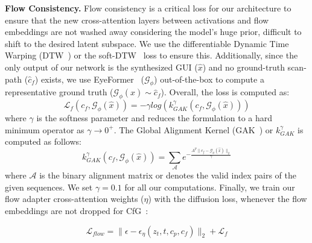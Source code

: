 \textbf{Flow Consistency.}
Flow consistency is a critical loss for our architecture to ensure that the new cross-attention layers between activations and flow embeddings are not washed away considering the model's huge prior, difficult to shift to the desired latent subspace.
We use the differentiable Dynamic Time Warping (DTW~\cite{dtw}) or the soft-DTW~\cite{soft-dtw} loss to ensure this.
Additionally, since the only output of our network is the synthesized GUI ($\hat{x}$) and no ground-truth scan-path ($\hat{c}_f$) exists, we use EyeFormer~\cite{eyeformer} ($\mathcal{G}_\phi$) out-of-the-box to compute a representative ground truth ($\mathcal{G}_\phi(\hat{x}) \sim \hat{c}_f$). 
Overall, the loss is computed as:
\begin{equation}
    \mathcal{L}_{f}(c_f, \mathcal{G}_\phi(\hat{x})) = -\gamma log( k^{\gamma}_{GAK}(c_f, \mathcal{G}_\phi(\hat{x})))
\end{equation}
where $\gamma$ is the softness parameter and reduces the formulation to a hard minimum operator as $\gamma \rightarrow 0^+$. 
The Global Alignment Kernel (GAK~\cite{GAK}) or $k^{\gamma}_{GAK}$ is computed as follows:
\begin{equation}
    k^{\gamma}_{GAK}(c_f, \mathcal{G}_\phi(\hat{x})) = \sum_{\mathcal{A}} e^{-\frac{A^T \|c_f - \mathcal{G}_\phi(\hat{x}) \|_2}{\gamma}}
\end{equation}
where $\mathcal{A}$ is the binary alignment matrix or denotes the valid index pairs of the given sequences. 
We set $\gamma = 0.1$ for all our computations. Finally, we train our flow adapter cross-attention weights ($\eta$) with the diffusion loss, whenever the flow embeddings are not dropped for CfG~\cite{cfg}:

\begin{equation}
    \mathcal{L}_{flow} = \| \epsilon - \epsilon_{\eta}(z_t, t, c_p, c_f) \|_2 + \mathcal{L}_f
\end{equation}



